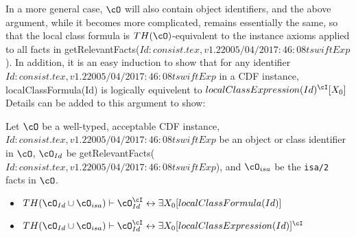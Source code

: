 In a more general case, $\cO$ will also contain object identifiers,
and the above argument, while it becomes more complicated, remains
essentially the same, so that the local class formula is
$TH(\cO)$-equivalent to the instance axioms applied to all facts in
{\sf getRelevantFacts($Id: consist.tex,v 1.2 2005/04/20 17:46:08 tswift Exp $)}.  In addition, it is an easy induction to
show that for any identifier $Id: consist.tex,v 1.2 2005/04/20 17:46:08 tswift Exp $ in a CDF instance, {\sc
localClassFormula(Id)} is logically equivelent to
$localClassExpression(Id)^{\cI}[X_0]$
%
%
Details can be added to this argument to show: 

\begin{lemma} \label{lem:localce}
Let $\cO$ be a well-typed, acceptable CDF instance, $Id: consist.tex,v 1.2 2005/04/20 17:46:08 tswift Exp $ be an object
or class identifier in $\cO$, $\cO_{Id}$ be {\sf
getRelevantFacts($Id: consist.tex,v 1.2 2005/04/20 17:46:08 tswift Exp $)}, and $\cO_{isa}$ be the {\tt isa/2} facts
in $\cO$.
\begin{itemize}
\item $TH(\cO_{Id} \cup \cO_{isa}) \vdash \cO_{Id}^{\cI}
\leftrightarrow \exists X_0 [localClassFormula(Id)] $
\item 
$TH(\cO_{Id} \cup \cO_{isa}) \vdash \cO_{Id}^{\cI}
\leftrightarrow \exists X_0[localClassExpression(Id)]^{\cI}$
\end{itemize}
\end{lemma}

